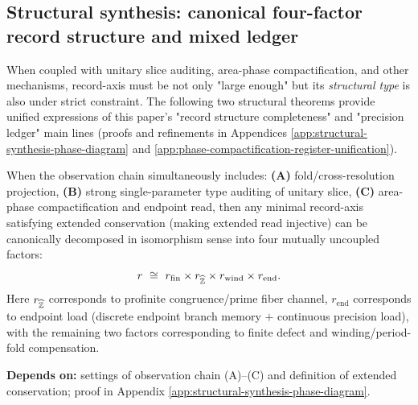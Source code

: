 \subsection{Structural synthesis: canonical four-factor record structure and mixed ledger}\label{subsec:four-factor-mixed-ledger}
When coupled with unitary slice auditing, area-phase compactification, and other mechanisms, record-axis must be not only "large enough" but its \emph{structural type} is also under strict constraint. The following two structural theorems provide unified expressions of this paper's "record structure completeness" and "precision ledger" main lines (proofs and refinements in Appendices \ref{app:structural-synthesis-phase-diagram} and \ref{app:phase-compactification-register-unification}).\par

\begin{theorem}\label{thm:record-axis-four-factor}
When the observation chain simultaneously includes: \textbf{(A)} fold/cross-resolution projection, \textbf{(B)} strong single-parameter type auditing of unitary slice, \textbf{(C)} area-phase compactification and endpoint read, then any minimal record-axis satisfying extended conservation (making extended read injective) can be canonically decomposed in isomorphism sense into four mutually uncoupled factors:
$$
r\ \cong\ r_{\mathrm{fin}}\times r_{\widehat{\mathbb{Z}}}\times r_{\mathrm{wind}}\times r_{\mathrm{end}}.
$$
Here $r_{\widehat{\mathbb{Z}}}$ corresponds to profinite congruence/prime fiber channel, $r_{\mathrm{end}}$ corresponds to endpoint load (discrete endpoint branch memory $+$ continuous precision load), with the remaining two factors corresponding to finite defect and winding/period-fold compensation.\par
\noindent\textnormal{\textbf{Depends on:} settings of observation chain (A)--(C) and definition of extended conservation; proof in Appendix \ref{app:structural-synthesis-phase-diagram}.}\par
\end{theorem}

